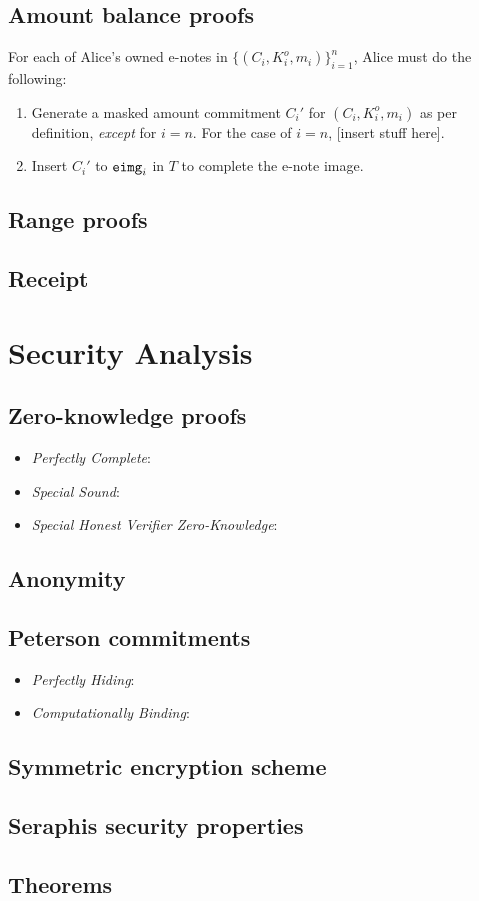 \documentclass{article}
\begin{document}
\subsection{Amount balance proofs}
For each of Alice's owned e-notes in $\{(C_i,K_i^o,m_i)\}_{i=1}^n$, Alice must do the following:
\begin{enumerate}
    \item Generate a masked amount commitment $C_i'$ for $(C_i, K_i^o, m_i)$ as per definition, \textit{except} for $i=n$. For the case of $i=n$, [insert stuff here].
    \item Insert $C_i'$ to ${\tt eimg}_i$ in $T$ to complete the e-note image.
\end{enumerate}

\subsection{Range proofs}

\subsection{Receipt}

\section{Security Analysis}
\subsection{Zero-knowledge proofs}
\begin{itemize}
    \item \textit{Perfectly Complete}:
    \item \textit{Special Sound}:
    \item \textit{Special Honest Verifier Zero-Knowledge}:
\end{itemize}
\subsection{Anonymity}
\subsection{Peterson commitments}
\begin{itemize}
    \item \textit{Perfectly Hiding}:
    \item \textit{Computationally Binding}:
\end{itemize}
\subsection{Symmetric encryption scheme}
\subsection{Seraphis security properties}
\subsection{Theorems}



\end{document}

